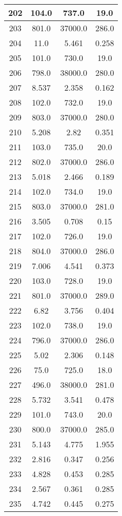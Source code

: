 \begin{table}[H]
\begin{tabular}{|c|c|c|c|}
\hline
202 & 104.0 & 737.0 & 19.0 \\
\hline
203 & 801.0 & 37000.0 & 286.0 \\
\hline
204 & 11.0 & 5.461 & 0.258 \\
\hline
205 & 101.0 & 730.0 & 19.0 \\
\hline
206 & 798.0 & 38000.0 & 280.0 \\
\hline
207 & 8.537 & 2.358 & 0.162 \\
\hline
208 & 102.0 & 732.0 & 19.0 \\
\hline
209 & 803.0 & 37000.0 & 280.0 \\
\hline
210 & 5.208 & 2.82 & 0.351 \\
\hline
211 & 103.0 & 735.0 & 20.0 \\
\hline
212 & 802.0 & 37000.0 & 286.0 \\
\hline
213 & 5.018 & 2.466 & 0.189 \\
\hline
214 & 102.0 & 734.0 & 19.0 \\
\hline
215 & 803.0 & 37000.0 & 281.0 \\
\hline
216 & 3.505 & 0.708 & 0.15 \\
\hline
217 & 102.0 & 726.0 & 19.0 \\
\hline
218 & 804.0 & 37000.0 & 286.0 \\
\hline
219 & 7.006 & 4.541 & 0.373 \\
\hline
220 & 103.0 & 728.0 & 19.0 \\
\hline
221 & 801.0 & 37000.0 & 289.0 \\
\hline
222 & 6.82 & 3.756 & 0.404 \\
\hline
223 & 102.0 & 738.0 & 19.0 \\
\hline
224 & 796.0 & 37000.0 & 286.0 \\
\hline
225 & 5.02 & 2.306 & 0.148 \\
\hline
226 & 75.0 & 725.0 & 18.0 \\
\hline
227 & 496.0 & 38000.0 & 281.0 \\
\hline
228 & 5.732 & 3.541 & 0.478 \\
\hline
229 & 101.0 & 743.0 & 20.0 \\
\hline
230 & 800.0 & 37000.0 & 285.0 \\
\hline
231 & 5.143 & 4.775 & 1.955 \\
\hline
232 & 2.816 & 0.347 & 0.256 \\
\hline
233 & 4.828 & 0.453 & 0.285 \\
\hline
234 & 2.567 & 0.361 & 0.285 \\
\hline
235 & 4.742 & 0.445 & 0.275 \\

\end{tabular}
\end{table}
